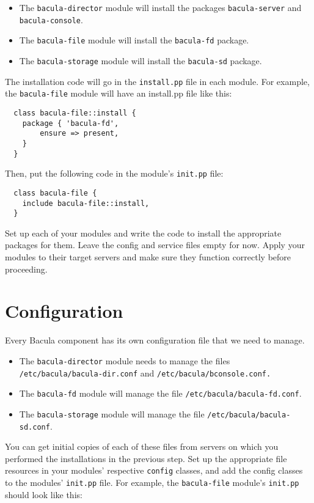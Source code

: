 \documentclass{article}   	%
\begin{document}
\begin{itemize}
	\item The \texttt{bacula-director} module will install the packages \texttt{bacula-server} and \texttt{bacula-console}.
	\item The \texttt{bacula-file} module will install the \texttt{bacula-fd} package.
	\item The \texttt{bacula-storage} module will install the \texttt{bacula-sd} package.
\end{itemize}

The installation code will go in the \texttt{install.pp} file in each module.  For example, the \texttt{bacula-file} module will have an install.pp file like this:

\begin{verbatim}
  class bacula-file::install {
    package { 'bacula-fd', 
        ensure => present,
    }
  }
\end{verbatim}

Then, put the following code in the module's \texttt{init.pp} file:

\begin{verbatim}
  class bacula-file {
    include bacula-file::install,
  }
\end{verbatim}

Set up each of your modules and write the code to install the appropriate packages for them.  Leave the config and service files empty for now.  Apply your modules to their target servers and make sure they function correctly before proceeding.

\section{Configuration}
Every Bacula component has its own configuration file that we need to manage.  

\begin{itemize}
	\item The \texttt{bacula-director} module needs to manage the files \texttt{/etc/bacula/bacula-dir.conf} and \texttt{/etc/bacula/bconsole.conf.}
	\item The \texttt{bacula-fd} module will manage the file \texttt{/etc/bacula/bacula-fd.conf}.
	\item The \texttt{bacula-storage} module will manage the file \texttt{/etc/bacula/bacula-sd.conf}.
\end{itemize}

You can get initial copies of each of these files from servers on which you performed the installations in the previous step. Set up the appropriate file resources in your modules' respective \texttt{config} classes, and add the config classes to the modules' \texttt{init.pp} file.  For example, the \texttt{bacula-file} module's \texttt{init.pp} should look like this:
\end{document}
